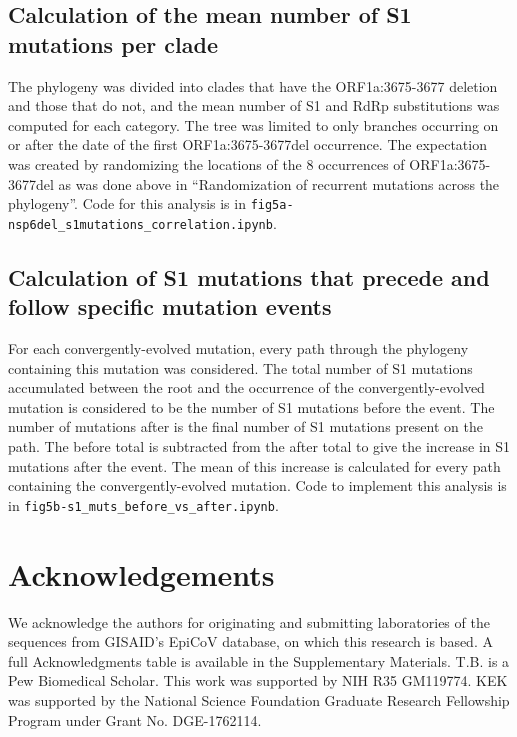 \documentclass[11pt,oneside,letterpaper]{article}
\begin{document}
\subsection*{Calculation of the mean number of S1 mutations per clade}
The phylogeny was divided into clades that have the ORF1a:3675-3677 deletion and those that do not, and the mean number of S1 and RdRp substitutions was computed for each category. 
The tree was limited to only branches occurring on or after the date of the first ORF1a:3675-3677del occurrence. 
The expectation was created by randomizing the locations of the 8 occurrences of ORF1a:3675-3677del as was done above in “Randomization of recurrent mutations across the phylogeny”. 
Code for this analysis is in \texttt{fig5a-nsp6del\_s1mutations\_correlation.ipynb}.

\subsection*{Calculation of S1 mutations that precede and follow specific mutation events}
For each convergently-evolved mutation, every path through the phylogeny containing this mutation was considered. 
The total number of S1 mutations accumulated between the root and the occurrence of the convergently-evolved mutation is considered to be the number of S1 mutations before the event. 
The number of mutations after is the final number of S1 mutations present on the path. 
The before total is subtracted from the after total to give the increase in S1 mutations after the event. 
The mean of this increase is calculated for every path containing the convergently-evolved mutation. 
Code to implement this analysis is in \texttt{fig5b-s1\_muts\_before\_vs\_after.ipynb}.

\section*{Acknowledgements}
\fussy
We acknowledge the authors for originating and submitting laboratories of the sequences from GISAID’s EpiCoV database, on which this research is based. 
A full Acknowledgments table is available in the Supplementary Materials. 
T.B. is a Pew Biomedical Scholar. 
This work was supported by NIH R35 GM119774. 
KEK was supported by the National Science Foundation Graduate Research Fellowship Program under Grant No. DGE-1762114.

\small


\normalsize
\clearpage
\end{document}
